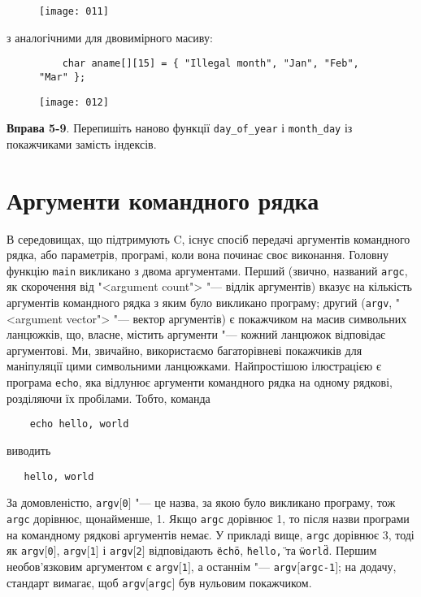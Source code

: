 \documentclass[a4paper,12pt]{book}
\begin{document}
  \begin{figure}[!htb]
  \centering
  \texttt{[image: 011]}
  \end{figure}
  з аналогічними для двовимірного масиву:
  \begin{figure}[!htb]
  \begin{verbatim}
    char aname[][15] = { "Illegal month", "Jan", "Feb", "Mar" };
  \end{verbatim}
  \centering
  \texttt{[image: 012]}
  \end{figure}

  \textbf{Вправа 5-9}. Перепишіть наново функції \texttt{day\_of\_year} і \texttt{month\_day}
  із покажчиками замість індексів.

\section{Аргументи командного рядка}


  В середовищах, що підтримують C, існує спосіб передачі аргументів командного рядка, або
  параметрів, програмі, коли вона починає своє виконання. Головну функцію \texttt{main}
  викликано з двома аргументами. Перший (звично, названий \texttt{argc}, як скорочення від
  "<argument count"> "--- відлік аргументів) вказує на кількість аргументів
  командного рядка з яким було викликано програму; другий (\texttt{argv}, "<argument
  vector"> "--- вектор аргументів) є покажчиком на масив символьних
  ланцюжків, що, власне, містить аргументи "--- кожний ланцюжок відповідає аргументові.
  Ми, звичайно, використаємо багаторівневі покажчиків для маніпуляції цими символьними
  ланцюжками. Найпростішою ілюстрацією є програма \texttt{echo}, яка відлунює аргументи
  командного рядка на одному рядкові, розділяючи їх пробілами. Тобто, команда
  \begin{verbatim}
    echo hello, world
  \end{verbatim}
  виводить
  \begin{verbatim}
   hello, world
  \end{verbatim}

  За домовленістю, \texttt{argv\mbox{$[$}0\mbox{$]$}} "--- це назва, за якою було
  викликано програму, тож \texttt{argc} дорівнює, щонайменше, 1. Якщо \texttt{argc}
  дорівнює 1, то після назви програми на командному рядкові аргументів немає. У прикладі
  вище, \texttt{argc} дорівнює 3, тоді як \texttt{argv\mbox{$[$}0\mbox{$]$}},
  \texttt{argv\mbox{$[$}1\mbox{$]$}} і \texttt{argv\mbox{$[$}2\mbox{$]$}} відповідають
  \texttt{\"{}echo\"{}}, \texttt{\"{}hello,\"{}} та \texttt{\"{}world\"{}}. Першим
  необов'язковим аргументом є \texttt{argv\mbox{$[$}1\mbox{$]$}}, а останнім "---
  \texttt{argv\mbox{$[$}argc-1\mbox{$]$}}; на додачу, стандарт вимагає, щоб
  \texttt{argv\mbox{$[$}argc\mbox{$]$}} був нульовим покажчиком.
\end{document}

